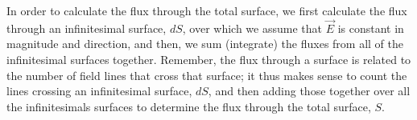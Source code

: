 In order to calculate the flux through the total surface, we first calculate the flux through an infinitesimal surface, $dS$, over which we assume that $\vec E$ is constant in magnitude and direction, and then, we sum (integrate) the fluxes from all of the infinitesimal surfaces together. Remember, the flux through a surface is related to the number of field lines that cross that surface; it thus makes sense to count the lines crossing an infinitesimal surface, $dS$, and then adding those together over all the infinitesimals surfaces to determine the flux through the total surface, $S$.
\newpage
